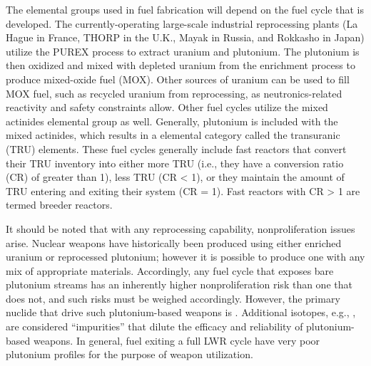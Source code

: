 The elemental groups used in fuel fabrication will depend on the fuel cycle that
is developed. The currently-operating large-scale industrial reprocessing plants
(La Hague in France, THORP in the U.K., Mayak in Russia, and Rokkasho in Japan)
utilize the PUREX process to extract uranium and plutonium. The plutonium is
then oxidized and mixed with depleted uranium from the enrichment process to
produce mixed-oxide fuel (MOX). Other sources of uranium can be used to fill MOX
fuel, such as recycled uranium from reprocessing, as neutronics-related
reactivity and safety constraints allow. Other fuel cycles utilize the mixed
actinides elemental group as well. Generally, plutonium is included with the
mixed actinides, which results in a elemental category called the transuranic
(TRU) elements. These fuel cycles generally include fast reactors that convert
their TRU inventory into either more TRU (i.e., they have a conversion ratio
(CR) of greater than 1), less TRU (CR < 1), or they maintain the amount of TRU
entering and exiting their system (CR = 1). Fast reactors with CR > 1 are termed
breeder reactors.

It should be noted that with any reprocessing capability, nonproliferation
issues arise. Nuclear weapons have historically been produced using either
enriched uranium or reprocessed plutonium; however it is possible to produce one
with any mix of appropriate materials. Accordingly, any fuel cycle that exposes
bare plutonium streams has an inherently higher nonproliferation risk than one
that does not, and such risks must be weighed accordingly. However, the primary
nuclide that drive such plutonium-based weapons is . Additional
isotopes, e.g., , are considered ``impurities'' that dilute the
efficacy and reliability of plutonium-based weapons. In general, fuel exiting a
full LWR cycle have very poor plutonium profiles for the purpose of weapon
utilization.
